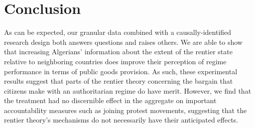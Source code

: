 \documentclass[12pt, letterpaper]{article}
\begin{document}

 

\section*{Conclusion}


As can be expected, our granular data combined with a causally-identified research design both answers questions and raises others. We are able to show that increasing Algerians' information about the extent of the rentier state relative to neighboring countries does improve their perception of regime performance in terms of public goods provision. As such, these experimental results suggest that parts of the rentier theory concerning the bargain that citizens make with an authoritarian regime do have merit. However, we find that the treatment had no discernible effect in the aggregate on important accountability measures such as joining protest movements, suggesting that the rentier theory's mechanisms do not necessarily have their anticipated effects.
\end{document}
